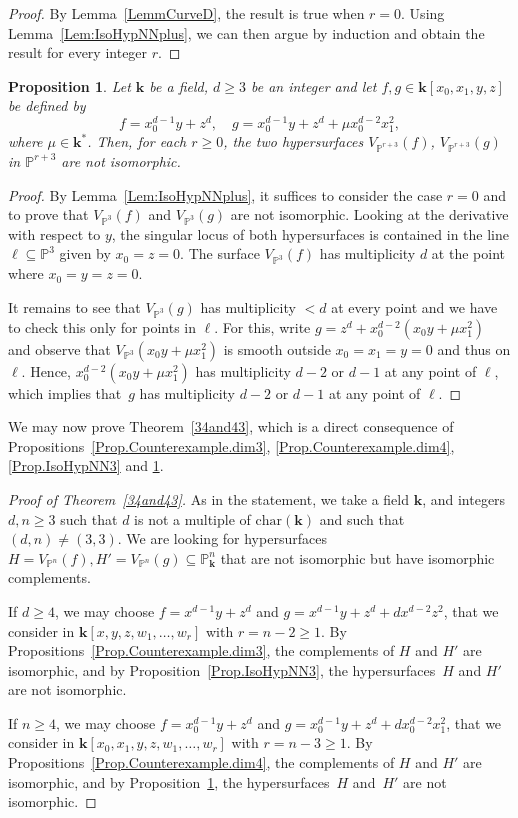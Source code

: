 \documentclass[JEP,XML,SOM,Unicode,NoFloatCountersInSection,published]{cedram}
\newtheorem{proposition}[lemma]{Proposition}
\theoremstyle{definition}
\renewcommand\k{{\mathbf k}}
\newcommand\p{{\mathbb P}}\let\PP\p
\newcommand{\kk}{\mathbf{k}}
\begin{document}
\begin{proof}
By Lemma~\ref{LemmCurveD}, the result is true when $r=0$. Using Lemma~\ref{Lem:IsoHypNNplus}, we can then argue by induction and obtain the result for every integer $r$.
\end{proof}

\begin{proposition}
\label{Prop.IsoHypNN4}
Let $\kk$ be a field, $d \geq 3$ be an integer and let $f,g\in\kk[x_0,x_1,y,z]$ be defined by
\[
f=x_0^{d-1}y+z^{d}, \quad g=x_0^{d-1}y+z^{d}+\mu x_0^{d-2}x_1^2,
\] where $\mu\in \k^*$. Then, for each $r\ge 0$, the two hypersurfaces $V_{\p^{r+3}}(f)$, $V_{\p^{r+3}}(g)$ in $\p^{r+3}$ are not isomorphic.
\end{proposition}

\begin{proof}
By Lemma~\ref{Lem:IsoHypNNplus}, it suffices to consider the case $r=0$ and to prove that $V_{\p^{3}}(f)$ and $V_{\p^{3}}(g)$ are not isomorphic. Looking at the derivative with respect to $y$, the singular locus of both hypersurfaces is contained in the line $\ell\subseteq \p^3$
given by $x_0 = z = 0$.
The surface $V_{\p^{3}}(f)$ has multiplicity $d$ at the point where $x_0=y=z=0$.

It remains to see that $V_{\p^{3}}(g)$ has multiplicity $< d$ at every point
and we have to check this only for points in $\ell$.
For this, write $g=z^d+ x_0^{d-2}(x_0y+\mu x_1^2)$ and observe that $V_{\PP^3}(x_0y+\mu x_1^2)$ is smooth outside $x_0=x_1=y=0$ and thus on $\ell$.
Hence, $x_0^{d-2}(x_0y+\mu x_1^2)$ has multiplicity $d-2$ or $d-1$ at any point of $\ell$, which implies that~$g$ has multiplicity $d-2$ or $d-1$ at any point of $\ell$.
\end{proof}

We may now prove Theorem~\ref{34and43}, which is a direct consequence of Propositions~\ref{Prop.Counterexample.dim3}, \ref{Prop.Counterexample.dim4}, \ref{Prop.IsoHypNN3} and \ref{Prop.IsoHypNN4}.

\begin{proof}[Proof of Theorem~\ref{34and43}]
As in the statement, we take a field $\kk$, and integers $d,n\ge 3$ such that $d$ is not a multiple of $\mathrm{char}(\kk)$ and such that $(d,n)\neq (3,3)$. We are looking for hypersurfaces $H=V_{\p^n}(f),H'=V_{\p^n}(g)\subseteq \p^n_\k$ that are not isomorphic but have isomorphic complements.

If $d\ge 4$, we may choose $f=x^{d-1}y+z^{d}$ and $g=x^{d-1}y+z^{d}+dx^{d-2}z^2$, that we
consider in $\k[x,y,z,w_1,\ldots,w_r]$ with $r=n-2\ge 1$. By Propositions~\ref{Prop.Counterexample.dim3}, the complements of $H$ and $H'$ are isomorphic, and by Proposition~\ref{Prop.IsoHypNN3}, the hypersurfaces~$H$ and $H'$ are not isomorphic.

If $n\ge 4$, we may choose $f=x_0^{d-1}y+z^{d}$ and $g=x_0^{d-1}y+z^{d}+dx_0^{d-2}x_1^2$, that we consider in
$\k[x_0,x_1,y,z,w_1,\ldots,w_r]$ with $r=n-3\ge 1$. By Propositions~\ref{Prop.Counterexample.dim4}, the complements of $H$ and $H'$ are isomorphic, and by Proposition~\ref{Prop.IsoHypNN4}, the hypersurfaces~$H$ and~$H'$ are not isomorphic.
\end{proof}
\end{document}
